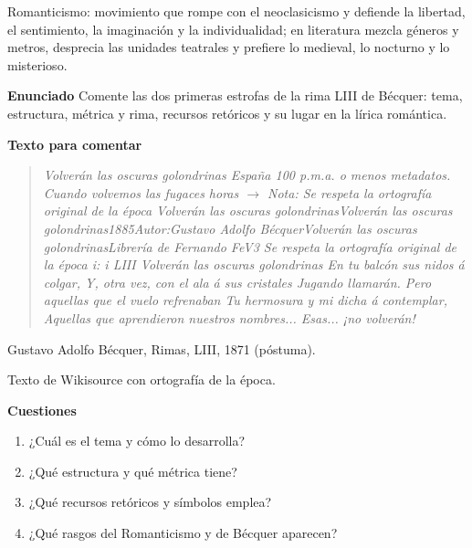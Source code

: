 \documentclass{book}
\begin{document}
\begin{tcolorbox}[title={Definición}, studiumdef, breakable]

Romanticismo: movimiento que rompe con el neoclasicismo y defiende la libertad, el sentimiento, la imaginación y la individualidad; en literatura mezcla géneros y metros, desprecia las unidades teatrales y prefiere lo medieval, lo nocturno y lo misterioso.

\end{tcolorbox}

\begin{tcolorbox}[title={Ejercicio resuelto}, studiumworked, breakable]

\noindent\textbf{Enunciado}
Comente las dos primeras estrofas de la rima LIII de Bécquer: tema, estructura, métrica y rima, recursos retóricos y su lugar en la lírica romántica.


\noindent\textbf{Texto para comentar}

\begin{quote}
\itshape Volverán las oscuras golondrinas España 100 p.m.a. o menos metadatos. Cuando volvemos las fugaces horas \(\to\) Nota: Se respeta la ortografía original de la época Volverán las oscuras golondrinasVolverán las oscuras golondrinas1885Autor:Gustavo Adolfo BécquerVolverán las oscuras golondrinasLibrería de Fernando FeV3 Se respeta la ortografía original de la época i: i LIII Volverán las oscuras golondrinas En tu balcón sus nidos á colgar, Y, otra vez, con el ala á sus cristales Jugando llamarán. Pero aquellas que el vuelo refrenaban Tu hermosura y mi dicha á contemplar, Aquellas que aprendieron nuestros nombres... Esas... ¡no volverán!
\end{quote}
{\noindent\footnotesize Gustavo Adolfo Bécquer, Rimas, LIII, 1871 (póstuma).\par}
{\noindent\footnotesize Texto de Wikisource con ortografía de la época.\par}

\noindent\textbf{Cuestiones}
\begin{enumerate}
\item ¿Cuál es el tema y cómo lo desarrolla?
\item ¿Qué estructura y qué métrica tiene?
\item ¿Qué recursos retóricos y símbolos emplea?
\item ¿Qué rasgos del Romanticismo y de Bécquer aparecen?
\end{enumerate}


\end{tcolorbox}
\end{document}
